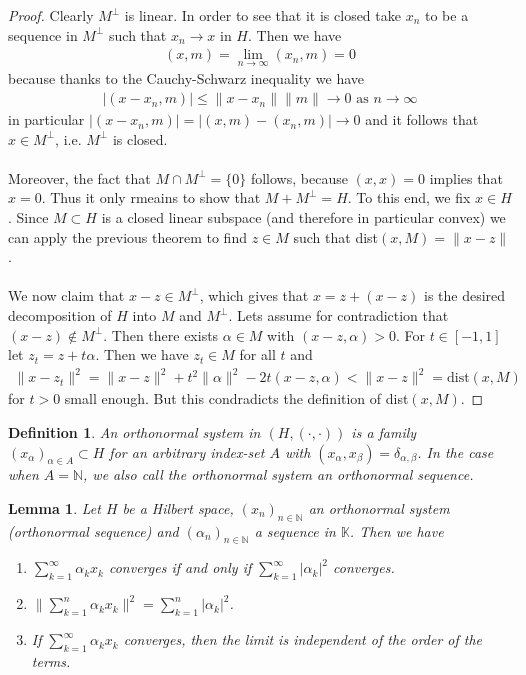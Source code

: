\documentclass[11pt,a4paper]{article}
\newtheorem{lem}{Lemma}[section]
\newtheorem{defn}{Definition}[section]
\theoremstyle{definition}
\begin{document}
\begin{proof}
Clearly $M^\perp$ is linear. In order to see that it is closed take $x_n$ to be a sequence in $M^\perp$ such that $x_n \to x$ in $H$. Then we have 
\begin{align*}
(x,m)= \lim_{n \to \infty} (x_n,m)=0
\end{align*}
because thanks to the Cauchy-Schwarz inequality we have 
\begin{align*}
|(x-x_n, m)| \leq \|x-x_n\| \|m\| \to 0 \text{ as } n \to \infty 
\end{align*}
in particular $|(x-x_n,m)|=|(x,m)-(x_n,m)| \to 0$ and it follows that $x \in M^\perp$, i.e. $M^\perp$ is closed. 
\\\\
Moreover, the fact that $M \cap M^\perp = \lbrace 0 \rbrace$ follows, because $(x,x)=0$ implies that $x=0$. Thus it only rmeains to show that $M+M^\perp = H$. To this end, we fix $x \in H$. Since $M \subset H$ is a closed linear subspace (and therefore in particular convex) we can apply the previous theorem to find $z \in M$ such that dist$(x,M)=\|x-z\|$.
\\\\
We now claim that $x-z  \in M^\perp$, which gives that $x = z + (x-z)$ is the desired decomposition of $H$ into $M$ and $M^\perp$. Lets assume for contradiction that $(x-z) \notin M^\perp$. Then there exists $\alpha \in M$ with $(x-z, \alpha )>0$. For $t \in [-1,1]$ let $z_t = z + t \alpha$. Then we have $z_t \in M$ for all $t$ and
\begin{align*}
\|x-z_t\|^2 = \|x-z\|^2 + t^2\| \alpha\|^2 -2t(x-z, \alpha) < \|x-z\|^2 = \text{dist}(x,M)
\end{align*}
for $t >0$ small enough. But this condradicts the definition of dist$(x,M)$. 
\end{proof}
\begin{defn} An orthonormal system in $(H, ( \cdot, \cdot))$ is a family $(x_\alpha)_{\alpha \in A} \subset H$ for an arbitrary index-set $A$ with $(x_\alpha, x_\beta)= \delta_{\alpha, \beta}$. In the case when $A = \mathbb{N}$, we also call the orthonormal system an orthonormal sequence. 
\end{defn}
\begin{lem} Let $H$ be a Hilbert space, $(x_n)_{n \in \mathbb{N}}$ an orthonormal system (orthonormal sequence) and $(\alpha_n)_{n \in \mathbb{N}}$ a sequence in $\mathbb{K}$. Then we have
\begin{enumerate}
\item $\sum_{k=1}^\infty \alpha_k x_k$ converges if and only if $\sum_{k=1}^\infty | \alpha_k|^2$ converges. 
\item $\| \sum_{k=1}^n \alpha_k x_k\|^2 = \sum_{k=1}^n |\alpha_k|^2$.
\item If $\sum_{k=1}^\infty \alpha_k x_k$ converges, then the limit is independent of the order of the terms. 
\end{enumerate}
\end{lem}
\end{document}
